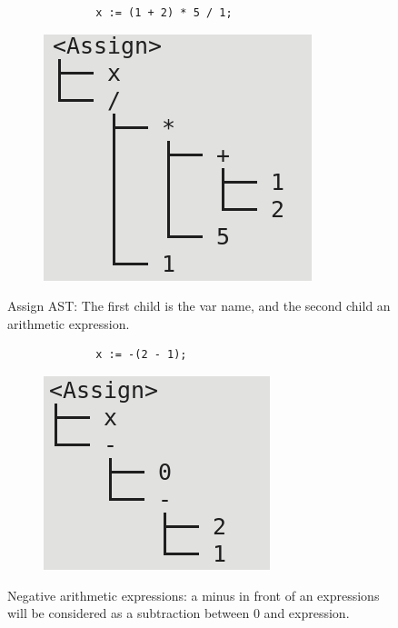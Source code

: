 \documentclass[letterpaper]{article}
\begin{document}
\begin{figure}[H]
    \begin{subfigure}{.5\textwidth}
        \begin{lstlisting}
        x := (1 + 2) * 5 / 1;
        \end{lstlisting}
    \end{subfigure}
    \begin{subfigure}{.5\textwidth}
    \includegraphics[scale=0.5]{image/assign.png}
\end{subfigure}
    \caption{Assign AST: The first child is the var name, and the second
    child an arithmetic expression.}
\end{figure}

\begin{figure}[H]
    \begin{subfigure}{.5\textwidth}
        \begin{lstlisting}
        x := -(2 - 1);
        \end{lstlisting}
    \end{subfigure}
    \begin{subfigure}{.5\textwidth}
    \includegraphics[scale=0.5]{image/neg-assign.png}
\end{subfigure}
    \caption{Negative arithmetic expressions: a minus in front of an
    expressions will be considered as a subtraction between 0 and expression.}
\end{figure}
\end{document}
